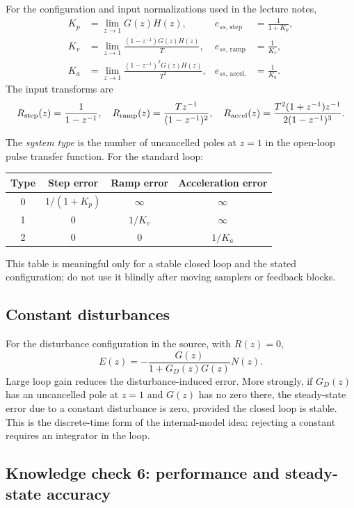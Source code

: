 \documentclass[11pt]{article}
\begin{document}
For the configuration and input normalizations used in the lecture notes,
\begin{align*}
K_p&=\lim_{z\to1}G(z)H(z),
&e_{ss,\,\text{step}}&=\frac{1}{1+K_p},\\
K_v&=\lim_{z\to1}\frac{(1-z^{-1})G(z)H(z)}{T},
&e_{ss,\,\text{ramp}}&=\frac{1}{K_v},\\
K_a&=\lim_{z\to1}\frac{(1-z^{-1})^2G(z)H(z)}{T^2},
&e_{ss,\,\text{accel.}}&=\frac{1}{K_a}.
\end{align*}
The input transforms are
\[
R_{\rm step}(z)=\frac{1}{1-z^{-1}},\quad
R_{\rm ramp}(z)=\frac{Tz^{-1}}{(1-z^{-1})^2},\quad
R_{\rm accel}(z)=\frac{T^2(1+z^{-1})z^{-1}}{2(1-z^{-1})^3}.
\]

The \emph{system type} is the number of uncancelled poles at $z=1$ in the open-loop pulse transfer function. For the standard loop:
\begin{center}
\begin{tabular}{c c c c}
\toprule
Type & Step error & Ramp error & Acceleration error\\
\midrule
0 & $1/(1+K_p)$ & $\infty$ & $\infty$\\
1 & $0$ & $1/K_v$ & $\infty$\\
2 & $0$ & $0$ & $1/K_a$\\
\bottomrule
\end{tabular}
\end{center}
This table is meaningful only for a stable closed loop and the stated configuration; do not use it blindly after moving samplers or feedback blocks.

\subsection{Constant disturbances}

For the disturbance configuration in the source, with $R(z)=0$,
\[
E(z)=-\frac{G(z)}{1+G_D(z)G(z)}N(z).
\]
Large loop gain reduces the disturbance-induced error. More strongly, if $G_D(z)$ has an uncancelled pole at $z=1$ and $G(z)$ has no zero there, the steady-state error due to a constant disturbance is zero, provided the closed loop is stable. This is the discrete-time form of the internal-model idea: rejecting a constant requires an integrator in the loop.

\subsection*{Knowledge check 6: performance and steady-state accuracy}
\end{document}
